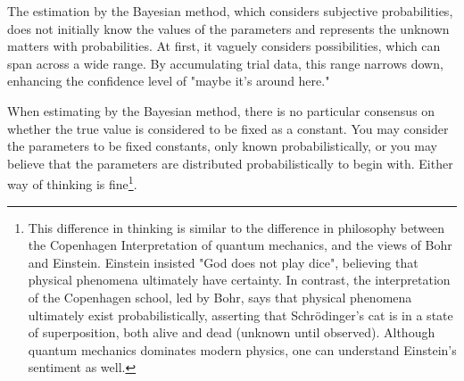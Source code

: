 \documentclass{ltjsarticle}
\begin{document}
The estimation by the Bayesian method, which considers subjective probabilities, does not initially know the values of the parameters and represents the unknown matters with probabilities. At first, it vaguely considers possibilities, which can span across a wide range. By accumulating trial data, this range narrows down, enhancing the confidence level of "maybe it's around here."

When estimating by the Bayesian method, there is no particular consensus on whether the true value is considered to be fixed as a constant. You may consider the parameters to be fixed constants, only known probabilistically, or you may believe that the parameters are distributed probabilistically to begin with. Either way of thinking is fine\footnote{This difference in thinking is similar to the difference in philosophy between the Copenhagen Interpretation of quantum mechanics, and the views of Bohr and Einstein. Einstein insisted "God does not play dice", believing that physical phenomena ultimately have certainty. In contrast, the interpretation of the Copenhagen school, led by Bohr, says that physical phenomena ultimately exist probabilistically, asserting that Schrödinger's cat is in a state of superposition, both alive and dead (unknown until observed). Although quantum mechanics dominates modern physics, one can understand Einstein's sentiment as well.}.
\end{document}
